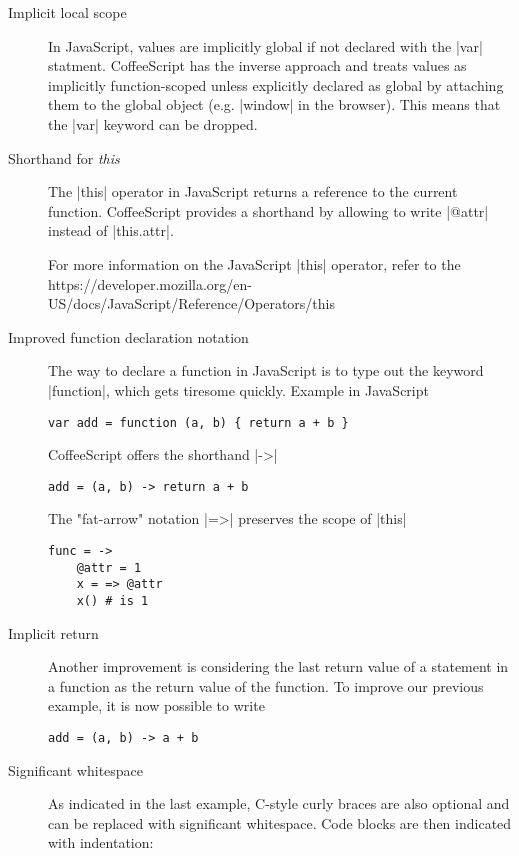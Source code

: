 \begin{description}
\item[Implicit local scope]
In JavaScript, values are implicitly global if not declared with the
|var| statment. CoffeeScript has the inverse approach and
treats values as implicitly function-scoped unless explicitly declared as
global by attaching them to the global object (e.g. |window| in the browser).
This means that the |var| keyword can be dropped.


\item[Shorthand for \emph{this}]
The |this| operator in JavaScript returns a reference to the current function.
CoffeeScript provides a shorthand by allowing to write |@attr| instead of
|this.attr|.

For more information on the JavaScript |this| operator, refer to the
{https://developer.mozilla.org/en-US/docs/JavaScript/Reference/Operators/this}

\item[Improved function declaration notation]
The way to declare a function in JavaScript is to type out the keyword
|function|, which gets tiresome quickly. Example in JavaScript

\begin{verbatim}
var add = function (a, b) { return a + b }
\end{verbatim}

CoffeeScript offers the shorthand |->|

\begin{verbatim}
add = (a, b) -> return a + b
\end{verbatim}

The "fat-arrow" notation |=>| preserves the scope of |this|

\begin{verbatim}
func = ->
    @attr = 1
    x = => @attr
    x() # is 1
\end{verbatim}

\item[Implicit return]
Another improvement is considering the last return value of a statement in a
function as the return value of the function. To improve our previous example,
it is now possible to write

\begin{verbatim}
add = (a, b) -> a + b
\end{verbatim}

\item[Significant whitespace]
As indicated in the last example, C-style curly braces are also optional and can
be replaced with significant whitespace. Code blocks are then indicated with
indentation:


\end{description}
